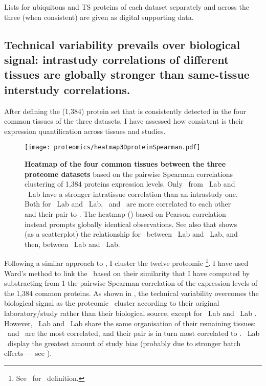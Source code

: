 Lists for ubiquitous and \gls{TS} proteins of each dataset separately
and across the three (when consistent) are given as digital supporting data.\mybr\

\vspace{-3mm}

\subsection{Technical variability prevails over biological signal:
intrastudy correlations of different tissues are globally stronger than
same-tissue interstudy correlations.}\label{subsec:protTechVarHigh}


After defining the (1,384) protein set that is consistently detected
in the four common tissues of the three datasets,
I have assessed how consistent is
their expression quantification across tissues and studies.\mybr\

\begin{figure}[!htbp]
    \texttt{[image: proteomics/heatmap3DproteinSpearman.pdf]}\centering
    \caption[Heatmap of the four common tissues between the three proteome
    datasets]{\label{fig:prot3Dheatmap}\textbf{Heatmap of the four common tissues
    between the three proteome datasets} based on
    the pairwise Spearman correlations clustering of 1,384 proteins expression levels.
    Only \heart\ from \cutler\ Lab and \pandey\ Lab have a stronger intratissue correlation
    than an intrastudy one.
    Both for \pandey\ Lab and \cutler\ Lab,
    \pancreas\ and \lung\ are more correlated to each other and their pair to \ovary.
    The heatmap ()
    based on Pearson correlation instead prompts globally identical observations.
    See also  that shows (as a scatterplot)
    the relationship for \Heart\ between \pandey\ Lab and \cutler\ Lab, and then,
     between
    \pandey\ Lab and \kuster\ Lab.
    }
\end{figure}

Following a similar approach to ,
I cluster the twelve proteomic \treps\footnote{See~ for \treps\ definition.}.
I have used Ward's method to link the \treps\ based on their similarity that
I have computed by substracting from 1 the pairwise Spearman correlation
of the expression levels of the 1,384 common proteins.
As shown in ,
the technical variability overcomes the biological signal
as the proteomic \treps\ cluster according to their original laboratory/study
rather than their biological source,
except for \cutler\ Lab and \pandey\ Lab \heart.
However,
\cutler\ Lab and \pandey\ Lab share the same organisation of their remaining tissues:
\pancreas\ and \lung\ are the most correlated,
and their pair is in turn most correlated to \ovary.
\kuster\ Lab \treps\ display the greatest amount of study bias
(probably due to stronger batch effects --- see ).\mybr\

